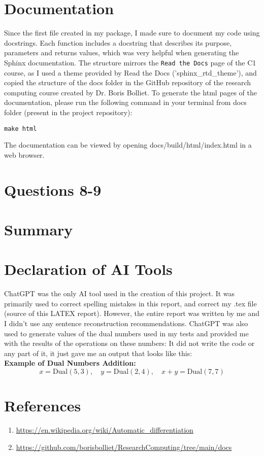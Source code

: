 \documentclass[a4paper,12pt]{article}
\begin{document}
\section{Documentation}
Since the first file created in my package, I made sure to document my code using docstrings. Each function includes a docstring that describes its purpose, parameters and returns values, which was very helpful when generating the Sphinx documentation. The structure mirrors the \texttt{Read the Docs} page of the C1 course, as I used a theme provided by Read the Docs ('sphinx\_rtd\_theme'), and copied the structure of the docs folder in the GitHub repository of the research computing course created by Dr. Boris Bolliet. 
To generate the html pages of the documentation, please run the following command in your terminal from docs folder (present in the project repository):
\begin{verbatim}
make html
\end{verbatim}
The documentation can be viewed by opening docs/build/html/index.html in a web browser.
\section{Questions 8-9}
\section{Summary}
\section{Declaration of AI Tools}
ChatGPT was the only AI tool used in the creation of this project. It was primarily used to correct spelling mistakes in this report, and correct my .tex file (source of this LATEX report). However, the entire report was written by me and I didn’t use any sentence reconstruction recommendations. ChatGPT was also used to generate values of the dual numbers used in my tests and provided me with the results of the operations on these numbers: It did not write the code or any part of it, it just gave me an output that looks like this: 
\\

\textbf{Example of Dual Numbers Addition:}
\[
x = \text{Dual}(5, 3), \quad y = \text{Dual}(2, 4), \quad x + y = \text{Dual}(7, 7)
\]

\section{References}
\begin{enumerate}
    \item \url{https://en.wikipedia.org/wiki/Automatic_differentiation}
    \item \url{https://github.com/borisbolliet/ResearchComputing/tree/main/docs}
\end{enumerate}
\end{document}
